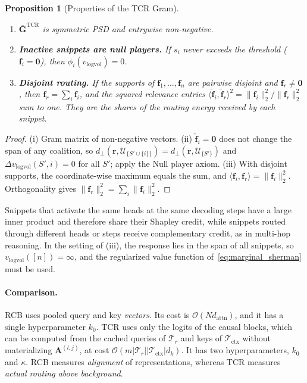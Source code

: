 \documentclass{article}
\newtheorem{proposition}{Proposition}
\begin{document}
\begin{proposition}[Properties of the TCR Gram]\label{prop:tcr}
\begin{enumerate}
    \item[(i)] $\bar{\mathbf{G}}^{\text{TCR}}$ is symmetric PSD and entrywise non-negative.
    \item[(ii)] \textbf{Inactive snippets are null players.} If $s_i$ never exceeds the threshold ($\mathbf{f}_i = \mathbf{0}$), then $\phi_i(v_{\text{logvol}}) = 0$.
    \item[(iii)] \textbf{Disjoint routing.} If the supports of $\mathbf{f}_1, \dots, \mathbf{f}_n$ are pairwise disjoint and $\mathbf{f}_r \neq \mathbf{0}$, then $\mathbf{f}_r = \sum_i \mathbf{f}_i$, and the squared relevance entries $\langle \hat{\mathbf{f}}_i, \hat{\mathbf{f}}_r \rangle^2 = \|\mathbf{f}_i\|_2^2 / \|\mathbf{f}_r\|_2^2$ sum to one. They are the shares of the routing energy received by each snippet.
\end{enumerate}
\end{proposition}

\begin{proof}
(i) Gram matrix of non-negative vectors. (ii) $\hat{\mathbf{f}}_i = \mathbf{0}$ does not change the span of any coalition, so $d_{\perp}(\mathbf{r}, \mathcal{U}_{\{S' \cup \{i\}\}}) = d_{\perp}(\mathbf{r}, \mathcal{U}_{\{S'\}})$ and $\Delta v_{\text{logvol}}(S', i) = 0$ for all $S'$; apply the Null player axiom. (iii) With disjoint supports, the coordinate-wise maximum equals the sum, and $\langle \mathbf{f}_i, \mathbf{f}_r \rangle = \|\mathbf{f}_i\|_2^2$. Orthogonality gives $\|\mathbf{f}_r\|_2^2 = \sum_i \|\mathbf{f}_i\|_2^2$.
\end{proof}

Snippets that activate the same heads at the same decoding steps have a large inner product and therefore share their Shapley credit, while snippets routed through different heads or steps receive complementary credit, as in multi-hop reasoning. In the setting of (iii), the response lies in the span of all snippets, so $v_{\text{logvol}}([n]) = \infty$, and the regularized value function of~\eqref{eq:marginal_sherman} must be used.

\paragraph{Comparison.}
RCB uses pooled query and key \emph{vectors}. Its cost is $\mathcal{O}(N d_{\text{attn}})$, and it has a single hyperparameter $k_0$. TCR uses only the logits of the causal blocks, which can be computed from the cached queries of $\mathcal{T}_r$ and keys of $\mathcal{T}_{\text{ctx}}$ without materializing $\mathbf{A}^{(l,j)}$, at cost $\mathcal{O}(m |\mathcal{T}_r| |\mathcal{T}_{\text{ctx}}| d_k)$. It has two hyperparameters, $k_0$ and $\kappa$. RCB measures \emph{alignment} of representations, whereas TCR measures \emph{actual routing above background}.
\end{document}
